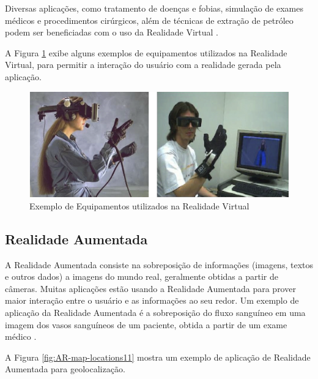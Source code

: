 Diversas aplicações, como tratamento de doenças e fobias, simulação de exames
médicos e procedimentos cirúrgicos, além de técnicas de extração de petróleo
podem ser beneficiadas com o uso da Realidade Virtual \cite{ARColaborativa}.


A Figura \ref{fig:equipamentos_rv} exibe alguns exemplos de equipamentos utilizados na Realidade
Virtual, para permitir a interação do usuário com a realidade gerada pela aplicação.

\begin{figure}[h!]
    \centering
    \caption{Exemplo de Equipamentos utilizados na Realidade Virtual}
    \label{fig:equipamentos_rv}
    \includegraphics[width=14cm]{resources/equipamentos-rv.png}
\end{figure}



\subsection{Realidade Aumentada}


A Realidade Aumentada consiste na sobreposição de informações (imagens, textos e outros dados) a imagens
do mundo real, geralmente obtidas a partir de câmeras. Muitas aplicações estão usando a Realidade Aumentada
para prover maior interação entre o usuário e as informações ao seu redor. Um exemplo de aplicação da 
Realidade Aumentada é a sobreposição do fluxo sanguíneo em uma imagem dos vasos sanguíneos de um paciente,
obtida a partir de um exame médico \cite{ARColaborativa}.

A Figura \ref{fig:AR-map-locations11} mostra um exemplo de aplicação de Realidade Aumentada para geolocalização.

